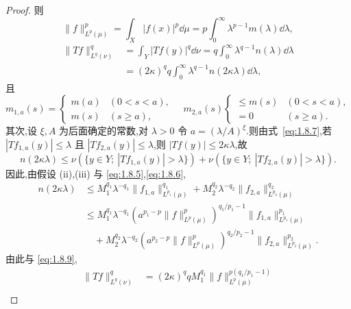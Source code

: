 \begin{proof}
则
\begin{equation}\tag{1.8.8}
\| f \|_{L^{p}(\mu)}^{p} = \int_{X}|f(x)|^{p}\dd \mu = p\int_{0}^{\infty}\lambda^{p-1}m(\lambda)\dd \lambda,
\label{eq:1.8.8}\end{equation}
\begin{equation}\tag{1.8.9}
\begin{aligned}
\| Tf \|_{L^{q}(\nu)}^{q} &= \displaystyle\int_{Y}|Tf(y)|^{q}\dd \nu = q\int_{0}^{\infty}\lambda^{q-1}n(\lambda)\dd \lambda \\
&= (2\kappa)^{q}q\displaystyle\int_{0}^{\infty}\lambda^{q-1}n(2\kappa\lambda)\dd \lambda,
\end{aligned}
\label{eq:1.8.9}\end{equation}
且
\begin{equation}\tag{1.8.10}
m_{1,a}(s) = \begin{cases} m(a) & (0 < s < a), \\ m(s) & (s \geq a), \end{cases} \quad
m_{2,a}(s)\begin{cases} \leq m(s) & (0 < s < a), \\ = 0 & (s \geq a). \end{cases}
\label{eq:1.8.10}\end{equation}
其次,设 $\xi, A$ 为后面确定的常数,对 $\lambda > 0$ 令 $a = (\lambda/A)^{\xi}$.则由式~\eqref{eq:1.8.7},若 $|Tf_{1,a}(y)| \leq \lambda$ 且 $|Tf_{2,a}(y)| \leq \lambda$,则 $|Tf(y)| \leq 2\kappa\lambda$,故
\begin{equation*}
n(2\kappa\lambda) \leq \nu(\{y \in Y;\ |Tf_{1,a}(y)| > \lambda\}) + \nu(\{y \in Y;\ |Tf_{2,a}(y)| > \lambda\}).
\end{equation*}
因此,由假设 (ii),(iii) 与 \eqref{eq:1.8.5},\eqref{eq:1.8.6},
\begin{align*}
n(2\kappa\lambda) & \leq M_{1}^{q_{1}}\lambda^{-q_{1}}\| f_{1,a} \|_{L^{p_{1}}(\mu)}^{q_{1}} + M_{2}^{q_{2}}\lambda^{-q_{2}}\| f_{2,a} \|_{L^{p_{2}}(\mu)}^{q_{2}} \\
& \leq M_{1}^{q_{1}}\lambda^{-q_{1}}\left(a^{p_{1}-p}\| f \|_{L^{p}(\mu)}^{p}\right)^{q_{1}/p_{1}-1}\| f_{1,a} \|_{L^{p_{1}}(\mu)}^{p_{1}} \\
& \quad + M_{2}^{q_{2}}\lambda^{-q_{2}}\left(a^{p_{2}-p}\| f \|_{L^{p}(\mu)}^{p}\right)^{q_{2}/p_{2}-1}\| f_{2,a} \|_{L^{p_{2}}(\mu)}^{p_{2}}.
\end{align*}
由此与 \eqref{eq:1.8.9},
\begin{align*}
\| Tf \|_{L^{q}(\nu)}^{q} & = (2\kappa)^{q}qM_{1}^{q_{1}}\| f \|_{L^{p}(\mu)}^{p(q_{1}/p_{1}-1)} \\

\end{align*}
\end{proof}
